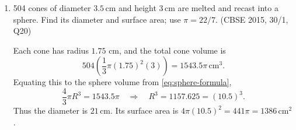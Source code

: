 \begin{enumerate}[label=\textbf{Q\arabic*.},ref=\arabic*,start=11]
\item 504 cones of diameter $3.5\,\mathrm{cm}$ and height $3\,\mathrm{cm}$ are melted and recast into a sphere. Find its diameter and surface area; use $\pi=22/7$. \hfill (CBSE 2015, 30/1, Q20)

\solution Each cone has radius $1.75$ cm, and the total cone volume is
\[
504\left(\frac13\pi(1.75)^2(3)\right)=1543.5\pi\,\mathrm{cm}^3.
\]
Equating this to the sphere volume from \eqref{eq:sphere-formula},
\[
\frac43\pi R^3=1543.5\pi\quad\Longrightarrow\quad R^3=1157.625=(10.5)^3.
\]
Thus the diameter is $\boxed{21\,\mathrm{cm}}$. Its surface area is $4\pi(10.5)^2=441\pi=\boxed{1386\,\mathrm{cm}^2}$.
\end{enumerate}

